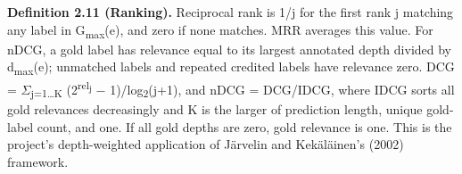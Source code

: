 {\small \textbf{Definition 2.11 (Ranking).} Reciprocal rank is 1/j for the first rank j matching any label in G\textsubscript{max}(e), and zero if none matches. MRR averages this value. For nDCG, a gold label has relevance equal to its largest annotated depth divided by d\textsubscript{max}(e); unmatched labels and repeated credited labels have relevance zero. DCG = \ensuremath{\Sigma}\textsubscript{j=1…K} (2\textsuperscript{rel\textsubscript{j}} \ensuremath{-} 1)/log\textsubscript{2}(j+1), and nDCG = DCG/IDCG, where IDCG sorts all gold relevances decreasingly and K is the larger of prediction length, unique gold-label count, and one. If all gold depths are zero, gold relevance is one. This is the project’s depth-weighted application of Järvelin and Kekäläinen’s (2002) framework.\par}

